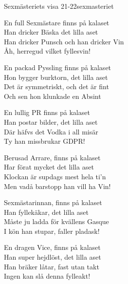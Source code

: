 \begin{song}{Sexmästeriets visa 21-22}{sexmasteriet}
\begin{vers}
En full Sexmästare finns på kalaset\\
Han dricker Bäska det lilla aset\\
Han dricker Punsch och han dricker Vin\\
Åh, herregud vilket fyllesvin!\\
\end{vers}

\begin{vers}
En packad Pyssling finns på kalaset\\
Hon bygger burktorn, det lilla aset\\
Det är symmetriskt, och det är fint\\
Och sen hon klunkade en Absint\\
\end{vers}

\begin{vers}
En lullig PR finns på kalaset\\
Han postar bilder, det lilla aset\\
Där häfvs det Vodka i all misär\\
Ty han missbrukar GDPR!
\end{vers}

\begin{vers}
Berusad Arrare, finns på kalaset\\
Har förat mycket det lilla aset\\
Klockan är supdags mest hela ti'n\\
Men vadå barstopp han vill ha Vin!
\end{vers}

\begin{vers}
Sexmästarinnan, finns på kalaset\\
Han fyllekäkar, det lilla aset\\
Måste ju ladda för kvällens Gasque\\
I kön han stupar, faller pladask!
\end{vers}

\begin{vers}
En dragen Vice, finns på kalaset\\
Han super hejdlöst, det lilla aset\\
Han bräker låtar, fast utan takt\\
Ingen kan slå denna fylleakt!
\end{vers}


\end{song}

